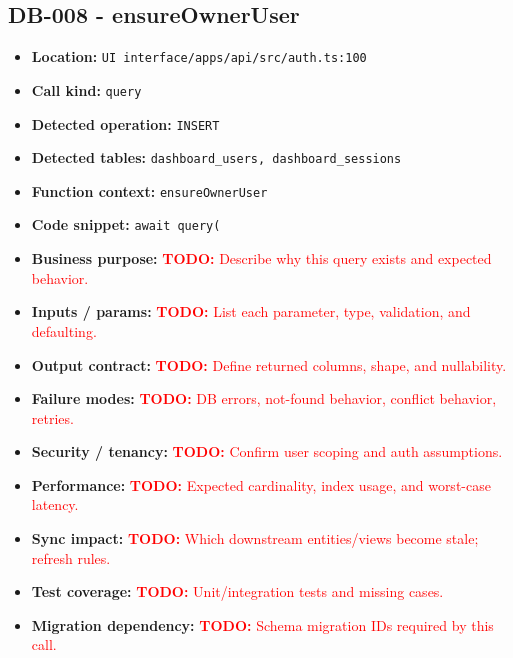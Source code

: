 \documentclass[11pt]{article}
\newcommand{\todoitem}[1]{\textcolor{red}{\textbf{TODO:} #1}}
\begin{document}
\subsection{DB-008 - ensureOwnerUser}
\begin{itemize}[leftmargin=1.5em]
\item \textbf{Location:} \texttt{UI interface/apps/api/src/auth.ts:100}
\item \textbf{Call kind:} \texttt{query}
\item \textbf{Detected operation:} \texttt{INSERT}
\item \textbf{Detected tables:} \texttt{dashboard\_users, dashboard\_sessions}
\item \textbf{Function context:} \texttt{ensureOwnerUser}
\item \textbf{Code snippet:} \texttt{await query(}
\item \textbf{Business purpose:} \todoitem{Describe why this query exists and expected behavior.}
\item \textbf{Inputs / params:} \todoitem{List each parameter, type, validation, and defaulting.}
\item \textbf{Output contract:} \todoitem{Define returned columns, shape, and nullability.}
\item \textbf{Failure modes:} \todoitem{DB errors, not-found behavior, conflict behavior, retries.}
\item \textbf{Security / tenancy:} \todoitem{Confirm user scoping and auth assumptions.}
\item \textbf{Performance:} \todoitem{Expected cardinality, index usage, and worst-case latency.}
\item \textbf{Sync impact:} \todoitem{Which downstream entities/views become stale; refresh rules.}
\item \textbf{Test coverage:} \todoitem{Unit/integration tests and missing cases.}
\item \textbf{Migration dependency:} \todoitem{Schema migration IDs required by this call.}
\end{itemize}
\end{document}
